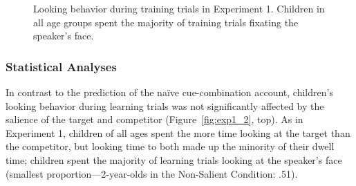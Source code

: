 \documentclass[man,floatsintext]{apa6}
\begin{document}
\begin{figure}[tb]
	\caption{\label{fig:exp1and2_split} Looking behavior during training trials in Experiment 1. Children in all age groups spent the majority of training trials fixating the speaker's face.}
\end{figure}

\subsubsection{Statistical Analyses}

In contrast to the prediction of the na\"{i}ve cue-combination account, children's looking behavior during learning trials was not significantly affected by the salience of the target and competitor (Figure~\ref{fig:exp1_2}, top). As in Experiment 1, children of all ages spent the more time looking at the target than the competitor, but looking time to both made up the minority of their dwell time; children spent the majority of learning trials looking at the speaker's face (smallest proportion---2-year-olds in the Non-Salient Condition: .51).
\end{document}
